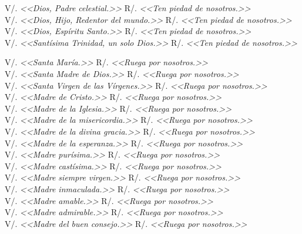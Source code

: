 \documentclass[12pt, letterpaper]{report}
\begin{document}
    \noindent
    \Large V/. \textit{<<Dios, Padre celestial.>>} \hfill{R/. \textit{<<Ten piedad de nosotros.>>}}\\
    \Large V/. \textit{<<Dios, Hijo, Redentor del mundo.>>} \hfill{R/. \textit{<<Ten piedad de nosotros.>>}}\\
    \Large V/. \textit{<<Dios, Espíritu Santo.>>} \hfill{R/. \textit{<<Ten piedad de nosotros.>>}}\\
    \Large V/. \textit{<<Santísima Trinidad, un solo Dios.>>} \hfill{R/. \textit{<<Ten piedad de nosotros.>>}}
    
    \noindent
    \Large V/. \textit{<<Santa María.>>} \hfill{R/. \textit{<<Ruega por nosotros.>>}}\\
    \Large V/. \textit{<<Santa Madre de Dios.>>} \hfill{R/. \textit{<<Ruega por nosotros.>>}}\\
    \Large V/. \textit{<<Santa Virgen de las Vírgenes.>>} \hfill{R/. \textit{<<Ruega por nosotros.>>}}\\
    \Large V/. \textit{<<Madre de Cristo.>>} \hfill{R/. \textit{<<Ruega por nosotros.>>}}\\
    \Large V/. \textit{<<Madre de la Iglesia.>>} \hfill{R/. \textit{<<Ruega por nosotros.>>}}\\
    \Large V/. \textit{<<Madre de la misericordia.>>} \hfill{R/. \textit{<<Ruega por nosotros.>>}}\\
    \Large V/. \textit{<<Madre de la divina gracia.>>} \hfill{R/. \textit{<<Ruega por nosotros.>>}}\\
    \Large V/. \textit{<<Madre de la esperanza.>>} \hfill{R/. \textit{<<Ruega por nosotros.>>}}\\
    \Large V/. \textit{<<Madre purísima.>>} \hfill{R/. \textit{<<Ruega por nosotros.>>}}\\
    \Large V/. \textit{<<Madre castísima.>>} \hfill{R/. \textit{<<Ruega por nosotros.>>}}\\
    \Large V/. \textit{<<Madre siempre virgen.>>} \hfill{R/. \textit{<<Ruega por nosotros.>>}}\\
    \Large V/. \textit{<<Madre inmaculada.>>} \hfill{R/. \textit{<<Ruega por nosotros.>>}}\\
    \Large V/. \textit{<<Madre amable.>>} \hfill{R/. \textit{<<Ruega por nosotros.>>}}\\
    \Large V/. \textit{<<Madre admirable.>>} \hfill{R/. \textit{<<Ruega por nosotros.>>}}\\
    \Large V/. \textit{<<Madre del buen consejo.>>} \hfill{R/. \textit{<<Ruega por nosotros.>>}}\\
\end{document}
